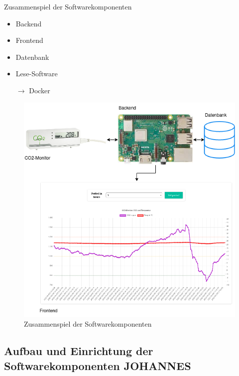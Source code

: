 \documentclass[10pt,ngerman]{beamer}
\begin{document}
\begin{frame}[fragile]{Zusammenspiel der Softwarekomponenten}

  \begin{minipage}[t]{0.29\textwidth}
    \begin{itemize}
      \item Backend
      \item Frontend
      \item Datenbank
      \item Lese-Software
      \item[$\rightarrow$] Docker
    \end{itemize}
  \end{minipage}
  \begin{minipage}[t]{0.69\textwidth}
    \begin{figure}
      \centering
      \includegraphics[width=1\textwidth]{pictures/SoftwareZusammenspiel.png}
      \caption{Zusammenspiel der Softwarekomponenten}
    \end{figure}
  \end{minipage}
\end{frame}

\subsection{Aufbau und Einrichtung der Softwarekomponenten JOHANNES}
\end{document}
